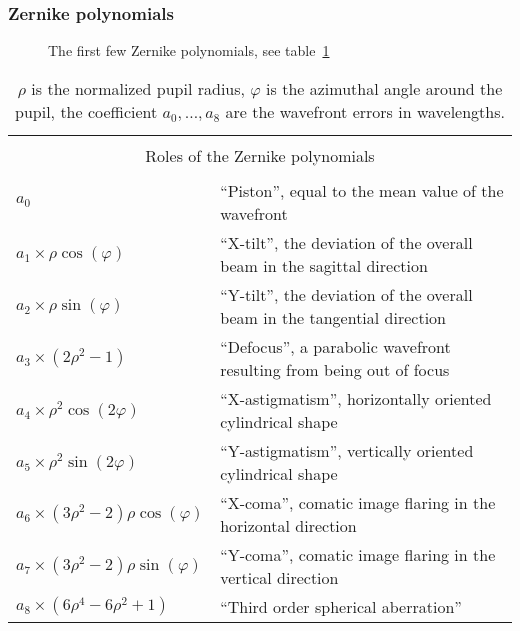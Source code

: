 \documentclass{article}
\begin{document}
\subsubsection{Zernike polynomials}

\begin{figure}[th!]
  \hfil{}\hfil
  \caption{The first few Zernike polynomials, see table~\ref{tab:zernike-polynomials} 
}
 \label{fig:zernike-polynomials}
\end{figure}

\begin{table}
\begin{tabular}{ll}
\hline\hline
&  \\
\multicolumn{2}{c}{Roles of the Zernike polynomials} \\
&  \\
$a_0$ & ``Piston'', equal to the mean value of the wavefront \\
$a_1\times\rho\cos(\varphi)$ & ``X-tilt'', the deviation of the overall beam in the sagittal direction \\
$a_2\times\rho\sin(\varphi)$ & ``Y-tilt'', the deviation of the overall beam in the tangential direction \\
$a_3\times(2\rho^2-1)$ & ``Defocus'', a parabolic wavefront resulting from being out of focus \\
$a_4\times\rho^2\cos(2\varphi)$ & ``X-astigmatism'', horizontally oriented cylindrical shape \\
$a_5\times\rho^2\sin(2\varphi)$ & ``Y-astigmatism'', vertically oriented cylindrical shape \\
$a_6\times(3\rho^2-2)\rho\cos(\varphi)$ & ``X-coma'', comatic image flaring in the horizontal direction \\
$a_7\times(3\rho^2-2)\rho\sin(\varphi)$ & ``Y-coma'', comatic image flaring in the vertical direction \\
$a_8\times(6\rho^4-6\rho^2+1)$ & ``Third order spherical aberration'' \\
\hline
\end{tabular}
\caption
{$\rho$ is the normalized pupil radius, $\varphi$ is the azimuthal angle around the pupil,
the coefficient $a_0,\ldots,a_8$ are the wavefront errors in wavelengths.}
\label{tab:zernike-polynomials}
\end{table}
\end{document}

